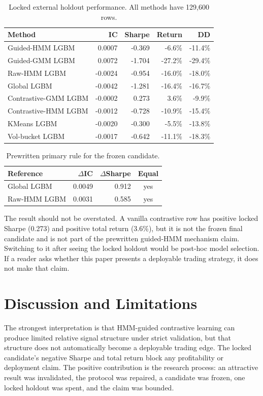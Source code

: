 \documentclass[sigconf,anonymous,review]{acmart}
\begin{document}
\begin{table}[t]
\caption{Locked external holdout performance. All methods have 129,600 rows.}
\label{tab:locked-results}
\scriptsize
\begin{tabular}{lrrrr}
\toprule
Method & IC & Sharpe & Return & DD \\
\midrule
Guided-HMM LGBM & 0.0007 & -0.369 & -6.6\% & -11.4\% \\
Guided-GMM LGBM & 0.0072 & -1.704 & -27.2\% & -29.4\% \\
Raw-HMM LGBM & -0.0024 & -0.954 & -16.0\% & -18.0\% \\
Global LGBM & -0.0042 & -1.281 & -16.4\% & -16.7\% \\
Contrastive-GMM LGBM & -0.0002 & 0.273 & 3.6\% & -9.9\% \\
Contrastive-HMM LGBM & -0.0012 & -0.728 & -10.9\% & -15.4\% \\
KMeans LGBM & -0.0020 & -0.300 & -5.5\% & -13.8\% \\
Vol-bucket LGBM & -0.0017 & -0.642 & -11.1\% & -18.3\% \\
\bottomrule
\end{tabular}
\end{table}

\begin{table}[t]
\caption{Prewritten primary rule for the frozen candidate.}
\label{tab:primary-rule}
\small
\begin{tabular}{lrrc}
\toprule
Reference & $\Delta$IC & $\Delta$Sharpe & Equal \\
\midrule
Global LGBM & 0.0049 & 0.912 & yes \\
Raw-HMM LGBM & 0.0031 & 0.585 & yes \\
\bottomrule
\end{tabular}
\end{table}

The result should not be overstated. A vanilla contrastive row has positive locked Sharpe (0.273) and positive total return (3.6\%), but it is not the frozen final candidate and is not part of the prewritten guided-HMM mechanism claim. Switching to it after seeing the locked holdout would be post-hoc model selection. If a reader asks whether this paper presents a deployable trading strategy, it does not make that claim.

\section{Discussion and Limitations}
The strongest interpretation is that HMM-guided contrastive learning can produce limited relative signal structure under strict validation, but that structure does not automatically become a deployable trading edge. The locked candidate's negative Sharpe and total return block any profitability or deployment claim. The positive contribution is the research process: an attractive result was invalidated, the protocol was repaired, a candidate was frozen, one locked holdout was spent, and the claim was bounded.
\end{document}

